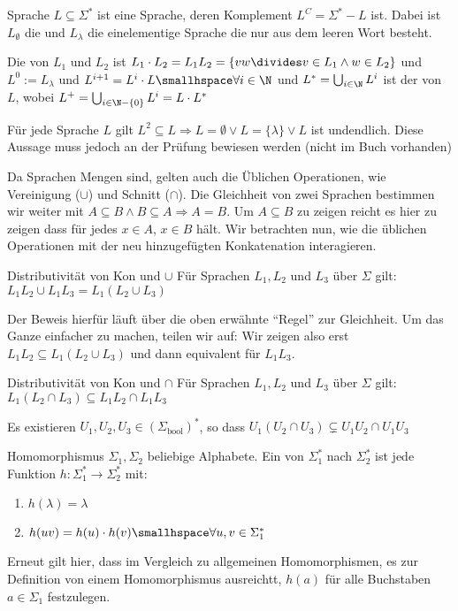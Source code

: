 \begin{definition}[]{Sprache}
    $L \subseteq \Sigma^*$ ist eine Sprache, deren Komplement $L^C = \Sigma^* - L$ ist. 
    Dabei ist $L_{\emptyset}$ die  und $L_{\lambda}$ die einelementige Sprache die nur aus dem leeren Wort besteht.

    Die  von $L_1$ und $L_2$ ist $L_1 \cdot L_2 = L_1 L_2 = \{ vw \divides v \in L_1 \land w \in L_2 \}$ und $L^0 := L_{\lambda}$ und $L^{i + 1} = L^i \cdot L \smallhspace \forall i \in \N$ und $L^* = \bigcup_{i \in \N} L^{i}$ ist der  von $L$, wobei $L^+ = \bigcup_{i \in \N - \{0\}} L^i = L \cdot L^*$
\end{definition}

Für jede Sprache $L$ gilt $L^2 \subseteq L \Longrightarrow L = \emptyset \lor L = \{ \lambda \} \lor L$ ist undendlich. 
Diese Aussage muss jedoch an der Prüfung bewiesen werden (nicht im Buch vorhanden)

Da Sprachen Mengen sind, gelten auch die Üblichen Operationen, wie Vereinigung ($\cup$) und Schnitt ($\cap$).
Die Gleichheit von zwei Sprachen bestimmen wir weiter mit $A \subseteq B \land B \subseteq A \Rightarrow A = B$.
Um $A \subseteq B$ zu zeigen reicht es hier zu zeigen dass für jedes $x \in A$, $x \in B$ hält.
Wir betrachten nun, wie die üblichen Operationen mit der neu hinzugefügten Konkatenation interagieren.

\begin{lemma}[]{Distributivität von Kon und $\cup$}
    Für Sprachen $L_1, L_2$ und $L_3$ über $\Sigma$ gilt: $L_1 L_2 \cup L_1 L_3 = L_1 (L_2 \cup L_3)$
\end{lemma}

Der Beweis hierfür läuft über die oben erwähnte ``Regel'' zur Gleichheit. 
Um das Ganze einfacher zu machen, teilen wir auf: Wir zeigen also erst $L_1 L_2 \subseteq L_1(L_2 \cup L_3)$ und dann equivalent für $L_1 L_3$.


\begin{lemma}[]{Distributivität von Kon und $\cap$}
    Für Sprachen $L_1, L_2$ und $L_3$ über $\Sigma$ gilt: $L_1 (L_2 \cap L_3) \subseteq L_1 L_2 \cap L_1 L_3$
\end{lemma}

\shortlemma Es existieren $U_1, U_2, U_3 \in (\Sigma_{\text{bool}})^*$, so dass $U_1 (U_2 \cap U_3) \subsetneq U_1 U_2 \cap U_1 U_3$



\begin{definition}[]{Homomorphismus}
    $\Sigma_1, \Sigma_2$ beliebige Alphabete. Ein  von $\Sigma^*_1$ nach $\Sigma^*_2$ ist jede Funktion $h: \Sigma_1^* \rightarrow \Sigma_2^*$ mit:
    \begin{enumerate}[label=\textit{(\roman*)}]
        \item $h(\lambda) = \lambda$
        \item $h(uv) = h(u) \cdot h(v) \smallhspace \forall u, v \in \Sigma_1^*$
    \end{enumerate}
\end{definition}

Erneut gilt hier, dass im Vergleich zu allgemeinen Homomorphismen, es zur Definition von einem Homomorphismus ausreichtt, $h(a)$ für alle Buchstaben $a \in \Sigma_1$ festzulegen.
